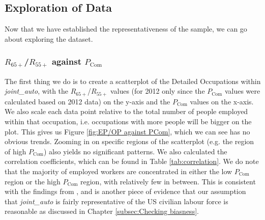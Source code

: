 \documentclass[11pt]{article}
\begin{document}
\subsection{Exploration of Data}
Now that we have established the representativeness of the sample, we can go about exploring the dataset. 

\subsubsection*{$R_{65+}$/$R_{55+}$ against $P_{\text{Com}}$}

The first thing we do is to create a scatterplot of the Detailed Occupations within \emph{joint\_auto}, with the $R_{65+}$/$R_{55+}$ values (for 2012 only since the $P_{\text{Com}}$ values were calculated based on 2012 data) on the y-axis and the $P_{\text{Com}}$ values on the x-axis. We also scale each data point relative to the total number of people employed within that occupation, i.e. occupations with more people will be bigger on the plot. This gives us Figure \ref{fig:EP/OP against PCom}, which we can see has no obvious trends. Zooming in on specific regions of the scatterplot (e.g. the region of high $P_{\text{Com}}$) also yields no significant patterns. We also calculated the correlation coefficients, which can be found in Table \ref{tab:correlation}. We do note that the majority of employed workers are concentrated in either the low $P_{\text{Com}}$ region or the high $P_{\text{Com}}$ region, with relatively few in between. This is consistent with the findings from \cite{osborne2017future}, and is another piece of evidence that our assumption that \emph{joint\_auto} is fairly representative of the US civilian labour force is reasonable as discussed in Chapter \ref{subsec:Checking biasness}. 
\end{document}
